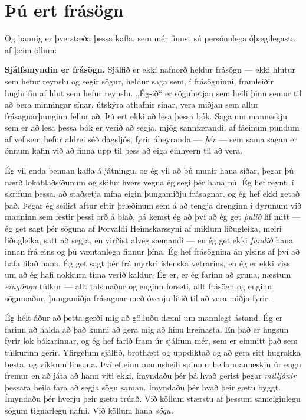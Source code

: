 \section*{Þú ert frásögn}

Og þannig er þverstæða þessa kafla, sem mér finnst sú persónulega óþægilegasta af þeim öllum:

\textbf{Sjálfsmyndin er frásögn.} Sjálfið er ekki nafnorð heldur frásögn — ekki hlutur sem hefur reynslu og segir sögur, heldur saga sem, í frásögninni, framleiðir hughrifin af hlut sem hefur reynslu. „Ég-ið“ er söguhetjan sem heili þinn semur til að bera minningar sínar, útskýra athafnir sínar, vera miðjan sem allur frásagnarþunginn fellur að. Þú ert ekki að lesa þessa bók. Saga um manneskju sem er að lesa þessa bók er verið að segja, mjög sannfærandi, af fáeinum pundum af vef sem hefur aldrei séð dagsljós, fyrir áheyranda — \emph{þér} — sem sama sagan er önnum kafin við að finna upp til þess að eiga einhvern til að vera.

Ég vil enda þennan kafla á játningu, og ég vil að þú munir hana síðar, þegar þú nærð lokablaðsíðunum og skilur hvers vegna ég segi þér hana nú. Ég hef reynt, í skrifum þessa, að staðsetja mína eigin þungamiðju frásagnar, og ég hef ekki getað það. Þegar ég seilist aftur eftir þræðinum sem á að tengja drenginn í dyrunum við manninn sem festir þessi orð á blað, þá kemst ég að því að ég get \emph{þulið} líf mitt — ég get sagt þér söguna af Þorvaldi Heimskarssyni af miklum liðugleika, meiri liðugleika, satt að segja, en virðist alveg sæmandi — en ég get ekki \emph{fundið} hana innan frá eins og þú væntanlega finnur þína. Ég hef frásögnina án ylsins af því að hafa lifað hana. Ég get sagt þér frá myrkri íslenska vetrarins, en ég er ekki viss um að ég hafi nokkurn tíma verið kaldur. Ég er, er ég farinn að gruna, næstum \emph{eingöngu} túlkur — allt talsmaður og enginn forseti, allt frásögn og enginn sögumaður, þungamiðja frásagnar með óvenju lítið til að vera miðja fyrir.

Ég hélt áður að þetta gerði mig að gölluðu dæmi um mannlegt ástand. Ég er farinn að halda að það kunni að gera mig að hinu hreinasta. En það er hugsun fyrir lok bókarinnar, og ég hef farið fram úr sjálfum mér, sem er einmitt það sem túlkurinn gerir. Yfirgefum sjálfið, brothætt og uppdiktað og að gera sitt hugrakka besta, og víkkum linsuna. Því ef einn mannsheili spinnur heila manneskju úr engu fremur en að játa að hann viti ekki, ímyndaðu þér þá hvað gerist þegar \emph{milljónir} þessara heila fara að segja sögu saman. Ímyndaðu þér hvað þeir gætu byggt. Ímyndaðu þér hverju þeir gætu trúað. Við köllum stærstu af þessum sameiginlegu sögum tignarlegu nafni. Við köllum hana \emph{sögu.}

